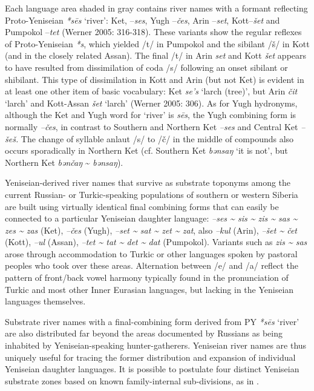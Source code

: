Each language area shaded in gray contains river names with a formant reflecting Proto-Yeniseian \textit{*s\=es} ‘river’: Ket, –\textit{ses}, Yugh –\textit{čes},\textit{ }Arin –\textit{set}, Kott–\textit{šet }and Pumpokol\textit{ }–\textit{tet} (Werner 2005: 316-318). These variants show the regular reflexes of Proto-Yeniseian \textit{*s}, which yielded /t/ in Pumpokol and the sibilant /š/ in Kott (and in the closely related Assan). The final /t/ in Arin \textit{set} and Kott\textit{ šet }appears to have resulted from dissimilation of coda /s/ following an onset sibilant or shibilant. This type of dissimilation in Kott and Arin (but not Ket) is evident in at least one other item of basic vocabulary: Ket \textit{se’s} ‘larch (tree)’, but Arin \textit{čit} ‘larch’ and Kott-Assan \textit{šet} ‘larch’ (Werner 2005: 306). As for Yugh hydronyms, although the Ket and Yugh word for ‘river’ is \textit{s\=es}, the Yugh combining form is normally \textit{–čes}, in contrast to Southern and Northern Ket \textit{–ses} and Central Ket \textit{–šeš.} The change of syllable anlaut /s/ to /č/ in the middle of compounds also occurs sporadically in Northern Ket (cf. Southern Ket \textit{bənsaŋ} ‘it is not’, but Northern Ket \textit{bənčaŋ} \~{} \textit{bənsaŋ}).

Yeniseian-derived river names that survive as substrate toponyms among the current Russian- or Turkic-speaking populations of southern or western Siberia are built using virtually identical final combining forms that can easily be connected to a particular Yeniseian daughter language: \textit{–ses \~{} sis \~{} zis \~{} sas \~{} zes \~{} zas }(Ket), \textit{–čes }(Yugh), \textit{–set \~{} sat \~{} zet \~{} zat}, also\textit{ –kul }(Arin), \textit{–šet \~{} čet }(Kott), \textit{–ul }(Assan), \textit{–tet \~{} tat \~{} det \~{} dat }(Pumpokol). Variants such as \textit{zis \~{} sas} arose through accommodation to Turkic or other languages spoken by pastoral peoples who took over these areas. Alternation between /e/ and /a/ reflect the pattern of front/back vowel harmony typically found in the pronunciation of Turkic and most other Inner Eurasian languages, but lacking in the Yeniseian languages themselves.

Substrate river names with a final-combining form derived from PY \textit{*s\=es} ‘river’ are also distributed far beyond the areas documented by Russians as being inhabited by Yeniseian-speaking hunter-gatherers. Yeniseian river names are thus uniquely useful for tracing the former distribution and expansion of individual Yeniseian daughter languages. It is possible to postulate four distinct Yeniseian substrate zones based on known family-internal sub-divisions, as in .

